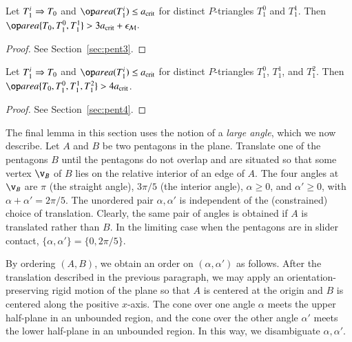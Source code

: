 \begin{lemma}
  Let $T_1^i\Rightarrow T_0$ and $\area(T_1^i)\le\acrit$  for
  distinct $P$-triangles $T_1^0$ and $T_1^1$.  Then
  $\area\{T_0,T_1^0,T_1^1\} > 3\acrit + \epsM$.
\end{lemma}

\begin{proof} See Section~\ref{sec:pent3}.
\end{proof}


\begin{lemma}
  Let $T_1^i\Rightarrow T_0$ and $\area(T_1^i)\le\acrit$ for distinct
  $P$-triangles $T_1^0$, $T_1^1$, and $T_1^2$.  Then
  $\area\{T_0,T_1^0,T_1^1,T_1^2\} > 4\acrit$.
\end{lemma}

\begin{proof} See Section~\ref{sec:pent4}.
\end{proof}


The final lemma in this section uses the notion of a \emph{large
angle}, which we now describe.  Let $A$
and $B$ be two pentagons in the plane.  Translate one of the pentagons
$B$ until the pentagons do not overlap and are situated so that some
vertex $\v_B$ of $B$ lies on the relative interior of an edge of $A$.
The four angles at $\v_B$ are $\pi$ (the straight angle), $3\pi/5$
(the interior angle), $\alpha\ge0$, and $\alpha'\ge0$, with
$\alpha+\alpha'=2\pi/5$.  The unordered pair $\alpha,\alpha'$ is
independent of the (constrained) choice of translation.  Clearly, the
same pair of angles is obtained if $A$ is translated rather than $B$.
In the limiting case when the pentagons are in slider contact,
$\{\alpha,\alpha'\}=\{0,2\pi/5\}$.

By ordering $(A,B)$, we obtain an order on
$(\alpha,\alpha')$ as follows.  After the translation described in the
previous paragraph, we may apply an orientation-preserving rigid
motion of the plane so that $A$ is centered at the origin and $B$ is
centered along the positive $x$-axis.  The cone over one angle $\alpha$
meets the upper half-plane in an unbounded region, and the cone over
the other angle $\alpha'$ meets the lower half-plane in an unbounded
region. In this way, we disambiguate $\alpha,\alpha'$.

